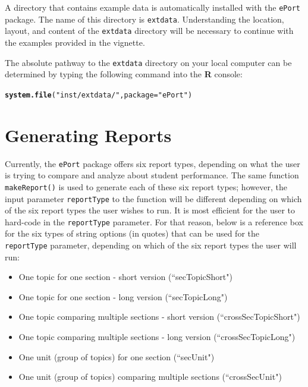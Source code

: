 \documentclass{article}\usepackage[]{graphicx}\usepackage[]{color}
\makeatletter
\newcommand{\hlstr}[1]{\textcolor[rgb]{0.192,0.494,0.8}{#1}}%
\newcommand{\hlstd}[1]{\textcolor[rgb]{0.345,0.345,0.345}{#1}}%
\newcommand{\hlkwc}[1]{\textcolor[rgb]{0.333,0.667,0.333}{#1}}%
\newcommand{\hlkwd}[1]{\textcolor[rgb]{0.737,0.353,0.396}{\textbf{#1}}}%
\newenvironment{kframe}{%
 \def\at@end@of@kframe{}%
 \ifinner\ifhmode%
  \def\at@end@of@kframe{\end{minipage}}%
  \begin{minipage}{\columnwidth}%
 \fi\fi%
 \def\FrameCommand##1{\hskip\@totalleftmargin \hskip-\fboxsep
 \colorbox{shadecolor}{##1}\hskip-\fboxsep
     \hskip-\linewidth \hskip-\@totalleftmargin \hskip\columnwidth}%
 \MakeFramed {\advance\hsize-\width
   \@totalleftmargin\z@ \linewidth\hsize
   \@setminipage}}%
 {\par\unskip\endMakeFramed%
 \at@end@of@kframe}
\newenvironment{knitrout}{}{} %
\numberwithin{equation}{section} %
\newcommand{\pkg}[1]{{\texttt{#1}}}
\makeatother
\begin{document}
A directory that contains example data is automatically installed with the \texttt{ePort} package. The name of this directory is \texttt{extdata}. Understanding the location, layout, and content of the \texttt{extdata} directory will be necessary to continue with the examples provided in the vignette.

The absolute pathway to the \texttt{extdata} directory on your local computer can be determined by typing the following command into the \textbf{\textsf{R}} console: \\

\begin{knitrout}
\color{fgcolor}\begin{kframe}
\begin{alltt}
\hlkwd{system.file}\hlstd{(}\hlstr{"inst/extdata/"}\hlstd{,} \hlkwc{package} \hlstd{=} \hlstr{"ePort"}\hlstd{)}
\end{alltt}
\end{kframe}
\end{knitrout}

\section{Generating Reports}

Currently, the \pkg{ePort} package offers six report types, depending on what the user is trying to compare and analyze about student performance. The same function \texttt{makeReport()} is used to generate each of these six report types; however, the input parameter \texttt{reportType} to the function will be different depending on which of the six report types the user wishes to run. It is most efficient for the user to hard-code in the \texttt{reportType} parameter. For that reason, below is a reference box for the six types of string options (in quotes) that can be used for the \texttt{reportType} parameter, depending on which of the six report types the user will run: 
\begin{framed}
\begin{itemize}
\vspace{-3mm}
\item One topic for one section - short version (``secTopicShort")
\item One topic for one section - long version (``secTopicLong")
\item One topic comparing multiple sections - short version (``crossSecTopicShort")
\item One topic comparing multiple sections - long version (``crossSecTopicLong")
\item One unit (group of topics) for one section (``secUnit")
\item One unit (group of topics) comparing multiple sections (``crossSecUnit")
\end{itemize}
\end{framed}
\end{document}
